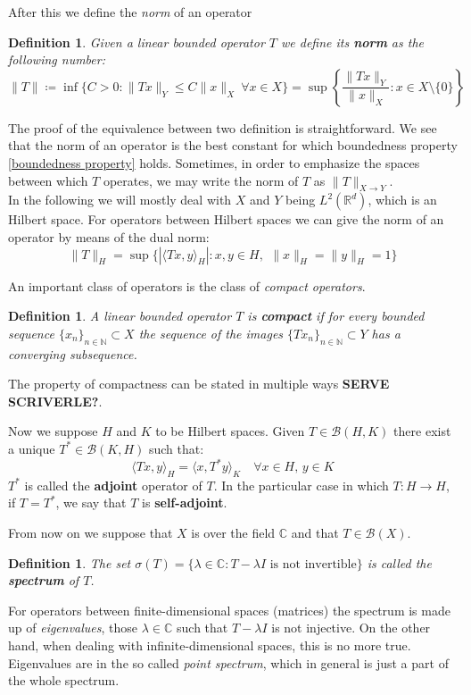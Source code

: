 \documentclass[corpo=11pt, stile=classica, tipotesi=custom,
greek, evenboxes, english]{toptesi}
\numberwithin{equation}{chapter}
\newtheorem{defi}[teo]{Definition}
\theoremstyle{remark}
\newcommand{\R}{\mathbb{R}} %
\newcommand{\N}{\mathbb{N}} %
\newcommand{\C}{\mathbb{C}} %
\newcommand{\B}{\mathscr{B}} %
\begin{document}
After this we define the \emph{norm} of an operator
\begin{defi}\label{norm operator}
	Given a linear bounded operator $T$ we define its \textbf{norm} as the following number:
	\begin{equation*}
		\|T\| \coloneqq \inf\{C>0 : \| Tx \|_Y \leq C \| x \|_X \  \forall x \in X\} = \sup \left\{ \dfrac{\| Tx \|_Y}{\| x \|_X} : x \in X \setminus \{0\}\right\}
	\end{equation*}
\end{defi}
The proof of the equivalence between two definition is straightforward. We see that the norm of an operator is the best constant for which boundedness property \eqref{boundedness property} holds. {\color{blue} Sometimes, in order to emphasize the spaces between which $T$ operates, we may write the norm of $T$ as $\| T \|_{X \rightarrow Y}$.}\\
In the following we will mostly deal with $X$ and $Y$ being $L^2(\R^d)$, which is an Hilbert space. For operators between Hilbert spaces we can give the norm of an operator by means of the dual norm:
\begin{equation*}
	\| T \|_H = \sup\{|\langle Tx, y \rangle_H| : x,y \in H,\,\ \|x\|_H = \|y\|_H = 1 \}
\end{equation*}

An important class of operators is the class of \emph{compact operators}.
\begin{defi}\label{compact operator}
	A linear bounded operator $T$ is \textbf{compact} if for every bounded sequence $\{x_n\}_{n \in \N} \subset X$ the sequence of the images $\{Tx_n\}_{n \in \N} \subset Y$ has a converging subsequence.
\end{defi}
The property of compactness can be stated in multiple ways \textbf{SERVE SCRIVERLE?}.

Now we suppose $H$ and $K$ to be Hilbert spaces. Given $T \in \B(H,K)$ there exist a unique $T^* \in \B(K,H)$ such that:
\begin{equation*}
	\langle Tx, y \rangle_H = \langle x, T^* y \rangle_K \quad \forall x \in H,\,y \in K
\end{equation*}
$T^*$ is called the \textbf{adjoint} operator of $T$. In the particular case in which $T : H \rightarrow H$, if $T=T^*$, we say that $T$ is \textbf{self-adjoint}.

From now on we suppose that $X$ is over the field $\C$ and that $T \in \B(X)$.
\begin{defi}\label{spectrum def}
	The set $\sigma(T) = \{\lambda \in \C : T - \lambda I \text{ is not invertible}\}$ is called  the \textbf{spectrum} of $T$.
\end{defi}
For operators between finite-dimensional spaces (matrices) the spectrum is made up of \emph{eigenvalues}, those $\lambda \in \C$ such that $T-\lambda I$ is not injective. On the other hand, when dealing with infinite-dimensional spaces, this is no more true. Eigenvalues are in the so called \emph{point spectrum}, which in general is just a part of the whole spectrum.
\end{document}
